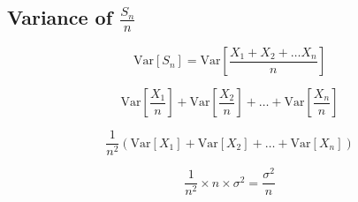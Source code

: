 \documentclass[11pt]{article}
\begin{document}
\begin{appendices}
\section{Variance of $\frac{S_{n}}{n}$}
\begin{equation}
\mathrm{Var}[S_n] = \mathrm{Var}[\frac{X_1 + X_2 + \dots X_n}{n}]
\end{equation}

\begin{equation}
\mathrm{Var}[\frac{X_1}{n}] + \mathrm{Var}[\frac{X_2}{n}] + \dots + \mathrm{Var}[\frac{X_n}{n}]
\end{equation}

\begin{equation}
\frac{1}{n^2}(\mathrm{Var}[X_1] + \mathrm{Var}[X_2] + \dots + \mathrm{Var}[X_n])
\end{equation}

\begin{equation}
\frac{1}{n^2} \times n \times \sigma^2 = \frac{\sigma^2}{n}
\end{equation}

\end{appendices}
\end{document}
